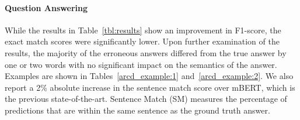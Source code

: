 \documentclass[10pt, a4paper]{article}
\begin{document}
\paragraph{Question Answering}
While the results in Table~\ref{tbl:results} show an improvement in F1-score, the exact match scores were significantly lower.
Upon further examination of the results, the majority of the erroneous answers differed from the true answer by one or two words with no significant impact on the semantics of the answer.  Examples are shown in Tables~\ref{arcd_example:1} and~\ref{arcd_example:2}.  We also report a 2\% absolute increase in the sentence match score over mBERT, which is the previous state-of-the-art.  Sentence Match (SM) measures the percentage of predictions that are within the same sentence as the ground truth answer.

\begin{table}[!ht]
\centering
\caption{Example of an erroneous results from the ARCD test set: the only difference is the preposition `` - \textit{In}".\label{arcd_example:1}}
\end{table}

\begin{table}[!ht]
\centering
\caption{Another example of an erroneous results from the ARCD test set: the predicted answer does not include ``introductory'' words.\label{arcd_example:2}}
\end{table}
\end{document}
